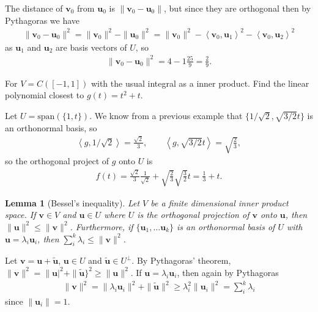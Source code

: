 \documentclass[letter-paper]{tufte-book}
\newtheorem{lemma}[theorem]{\color{pastel-blue}Lemma}
\newenvironment{proof}[1][Proof]{\begin{trivlist}
\item[\hskip \labelsep {\bfseries #1}]}{\end{trivlist}}
\newenvironment{example}[1][Example]{\begin{trivlist}
\item[\hskip \labelsep {\bfseries #1}]}{\end{trivlist}}
\newcommand{\inner}[2]{\left\langle #1, #2\right\rangle}
\newcommand{\ub}{{\boldsymbol{u}}}
\newcommand{\vb}{{\boldsymbol{v}}}
\begin{document}
\begin{example}
  The distance of $\vb_0$ from $\ub_0$ is $\|\vb_0 - \ub_0\|$, but since they are orthogonal then by Pythagoras we have
  \begin{align*}
    \|\vb_0 - \ub_0\|^2 = \|\vb_0\|^2 - \|\ub_0\|^2 = \|\vb_0\|^2 - \inner{\vb_0}{\ub_1}^2 - \inner{\vb_0}{\ub_2}^2
  \end{align*}
  as $\ub_1$ and $\ub_2$ are basis vectors of $U$, so
  \begin{align*}
    \|\vb_0 - \ub_0\|^2 = 4 - 1 \frac{25}{9} = \frac{2}{9}.
  \end{align*}
\end{example}

\begin{example}
  For $V=C([-1, 1])$ with the usual integral as a inner product. Find the linear polynomial closest to $g(t) = t^2 + t$.
  
  Let $U = \mbox{span}(\{1, t\})$. We know from a previous example that $\{1/\sqrt{2}, \sqrt{3/2} t\}$ is an orthonormal basis, so
  \begin{align*}
    \inner{g}{1/\sqrt{2}} = \frac{\sqrt{2}}{3}, \qquad \inner{g}{\sqrt{3/2} t} = \sqrt{\frac{2}{3}},
  \end{align*}
  so the orthogonal project of $g$ onto $U$ is
  \begin{align*}
    f(t) = \frac{\sqrt{2}}{3}\frac{1}{\sqrt{2}} + \sqrt{\frac{2}{3}}\sqrt{\frac{3}{2}}t = \frac{1}{3} + t.
  \end{align*}
\end{example}

\begin{lemma}[Bessel's inequality]
  Let $V$ be a finite dimensional inner product space. If $\vb \in V$ and $\ub \in U$ where $U$ is the orthogonal projection of $\vb$ onto $\ub$, then $\|\ub\|^2 \leq \|\vb\|^2$. Furthermore, if $\{\ub_1, \ldots \ub_k\}$ is an orthonormal basis of $U$ with $\ub = \lambda_i \ub_i$, then $\sum_i^k \lambda_i \leq \|\vb\|^2$.
\end{lemma}

\begin{proof}
  Let $\vb = \ub + \tilde{\ub}$, $\ub\in U$ and $\tilde{\ub}\in U^\perp$. By Pythagoras' theorem, $\|\vb\|^2 = \|\ub|^2 + \|\tilde{\ub}\}^2 \geq \|\ub\|^2$. If $\ub = \lambda_i \ub_i$, then again by Pythagoras
  \begin{align*}
    \|\vb\|^2 = \|\lambda_i \ub_i\|^2 + \|\tilde{\ub}\|^2 \geq \lambda_i^2 \|\ub_i\|^2 = \sum_i^k \lambda_i
  \end{align*}
  since $\|\ub_i\|=1$.
\end{proof}
\end{document}
